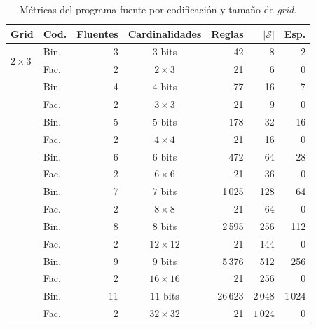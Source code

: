 \begin{table}[H]
    \centering
    \caption{Métricas del programa fuente por codificación y tamaño de \textit{grid}.}
    \label{tab:exp-rq2}
    \small
    \begin{tabular}{l l r c r r r}
        \toprule
        \textbf{Grid} & \textbf{Cod.} & \textbf{Fluentes} & \textbf{Cardinalidades} & \textbf{Reglas} & $|\mathcal{S}|$ & \textbf{Esp.} \\
        \midrule
        \multirow{2}{*}{$2 \times 3$}
            & Bin. & 3 & $3$ bits        &    42 &    8 &   2 \\
            & Fac. & 2 & $2 \times 3$    &    21 &    6 &   0 \\
        \addlinespace
        \multirow{2}{*}{$3 \times 3$}
            & Bin. & 4 & $4$ bits        &    77 &   16 &   7 \\
            & Fac. & 2 & $3 \times 3$    &    21 &    9 &   0 \\
        \addlinespace
        \multirow{2}{*}{$4 \times 4$}
            & Bin. & 5 & $5$ bits        &   178 &   32 &  16 \\
            & Fac. & 2 & $4 \times 4$    &    21 &   16 &   0 \\
        \addlinespace
        \multirow{2}{*}{$6 \times 6$}
            & Bin. & 6 & $6$ bits        &   472 &   64 &  28 \\
            & Fac. & 2 & $6 \times 6$    &    21 &   36 &   0 \\
        \addlinespace
        \multirow{2}{*}{$8 \times 8$}
            & Bin. & 7 & $7$ bits        & 1\,025 &  128 &  64 \\
            & Fac. & 2 & $8 \times 8$    &    21 &   64 &   0 \\
        \addlinespace
        \multirow{2}{*}{$12 \times 12$}
            & Bin. & 8 & $8$ bits        & 2\,595 &  256 & 112 \\
            & Fac. & 2 & $12 \times 12$  &    21 &  144 &   0 \\
        \addlinespace
        \multirow{2}{*}{$16 \times 16$}
            & Bin. & 9 & $9$ bits        & 5\,376 &  512 & 256 \\
            & Fac. & 2 & $16 \times 16$  &    21 &  256 &   0 \\
        \addlinespace
        \multirow{2}{*}{$32 \times 32$}
            & Bin. & 11 & $11$ bits     & $26\,623$ & $2\,048$ & $1\,024$ \\
            & Fac.  &  2 & $32 \times 32$ &    21 & $1\,024$ &   0 \\
        \bottomrule
    \end{tabular}
    \smallskip\\

\end{table}

